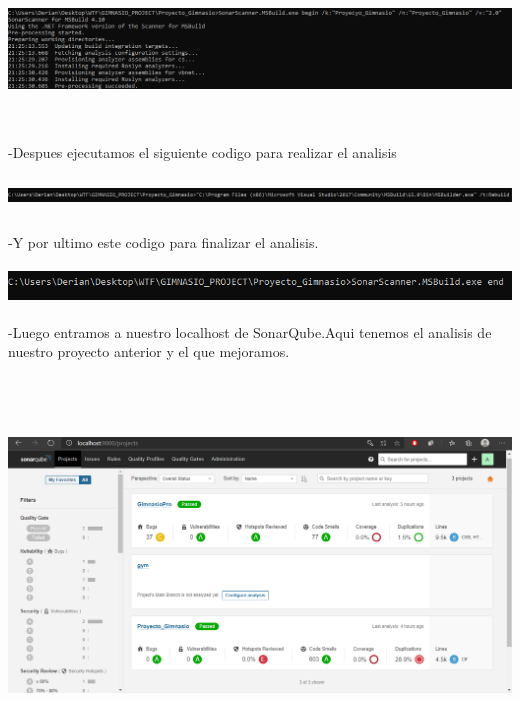 \documentclass[12pt,letterpaper]{article}
\begin{document}
     \begin{center}
        \includegraphics[width=15cm, height=4cm]{img/scan1.png}  
    \end{center}

    -Despues ejecutamos el siguiente codigo para realizar el analisis

    \begin{center}
        \includegraphics[width=20cm, height=1cm]{img/scan2.png}  
    \end{center}
    -Y por ultimo este codigo para finalizar el analisis.
    \begin{center}
        \includegraphics[width=15cm, height=1cm]{img/scan3.png}  
    \end{center}
    -Luego entramos a nuestro localhost de SonarQube.Aqui tenemos el 
    analisis de nuestro proyecto anterior y el que mejoramos.
    \begin{center}
        \includegraphics[width=18cm, height=10cm]{img/local1.png}  
    \end{center}
\end{document}
